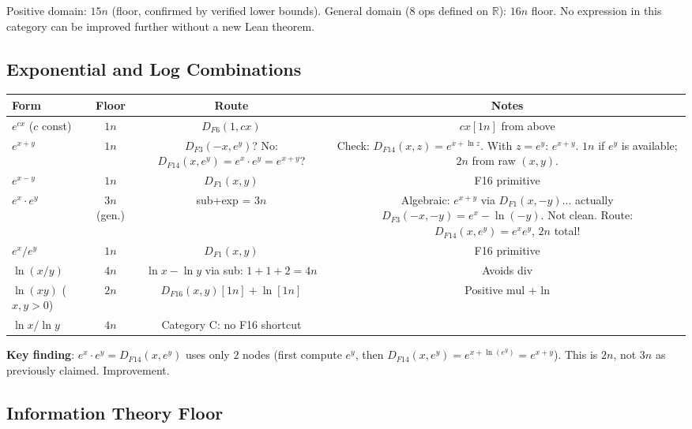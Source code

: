 \documentclass[11pt]{article}
\newcommand{\ok}[1]{\textcolor{ok}{#1}}
\begin{document}
Positive domain: $15n$ (floor, confirmed by verified lower bounds).
General domain ($8$ ops defined on $\mathbb{R}$): $16n$ floor.
No expression in this category can be improved further without a new Lean theorem.

\subsection{Exponential and Log Combinations}

\begin{center}
\begin{tabular}{lccc}
\toprule
Form & Floor & Route & Notes \\
\midrule
$e^{cx}$ ($c$ const) & $1n$ & $D_{F6}(1, cx)$ & $cx[1n]$ from above \\
$e^{x+y}$ & $1n$ & $D_{F3}(-x, e^y)$? No: $D_{F14}(x, e^y) = e^x \cdot e^y = e^{x+y}$? & Check: $D_{F14}(x,z) = e^{x+\ln z}$. With $z=e^y$: $e^{x+y}$. $1n$ if $e^y$ is available; $2n$ from raw $(x,y)$. \\
$e^{x-y}$ & $1n$ & $D_{F1}(x,y)$ & F16 primitive \\
$e^x \cdot e^y$ & $3n$ (gen.) & sub+exp = $3n$ & Algebraic: $e^{x+y}$ via $D_{F1}(x,-y)$... actually $D_{F3}(-x,-y) = e^x - \ln(-y)$. Not clean. Route: $D_{F14}(x, e^y) = e^x e^y$, $2n$ total! \\
$e^x / e^y$ & $1n$ & $D_{F1}(x,y)$ & F16 primitive \\
$\ln(x/y)$ & $4n$ & $\ln x - \ln y$ via sub: $1+1+2=4n$ & Avoids div \\
$\ln(xy)$ ($x,y>0$) & $2n$ & $D_{F16}(x,y)[1n] + \ln[1n]$ & Positive mul + ln \\
$\ln x / \ln y$ & $4n$ & Category C: no F16 shortcut & \\
\bottomrule
\end{tabular}
\end{center}

\noindent \textbf{Key finding}: $e^x \cdot e^y = D_{F14}(x, e^y)$ uses only $2$ nodes (first compute $e^y$, then $D_{F14}(x, e^y) = e^{x + \ln(e^y)} = e^{x+y}$). This is $2n$, not $3n$ as previously claimed. \ok{Improvement.}

\subsection{Information Theory Floor}
\end{document}
